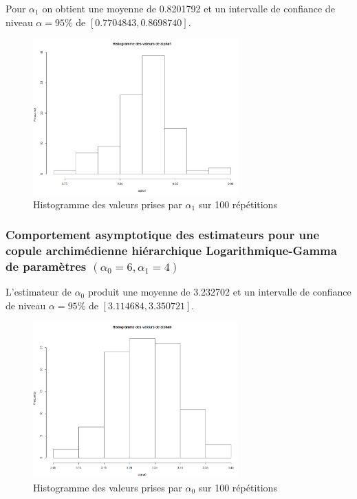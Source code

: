 \documentclass[11pt]{article}
\begin{document}
	Pour $\alpha_{1}$ on obtient une moyenne de  0.8201792 et un intervalle de confiance de niveau $\alpha = 95\% $ de $[0.7704843,0.8698740]$.

	\begin{figure}[H]
		\centering
		\includegraphics[height=6cm]{graph/alpha1.png}
		\caption[Paramètre $\alpha_{1}$]{Histogramme des valeurs prises par $\alpha_{1}$ sur 100 répétitions} 
		\label{alpha1}
	\end{figure}
		

\subsubsection{Comportement asymptotique des estimateurs pour une copule archimédienne hiérarchique Logarithmique-Gamma de paramètres $(\alpha_{0}=6,\alpha_{1}=4)$}

	L'estimateur de $\alpha_{0}$ produit une moyenne de 3.232702 et un intervalle de confiance de niveau $ \alpha = 95\% $ de $[3.114684,3.350721]$.
	
	\begin{figure}[H]
		\centering
		\includegraphics[height=6cm]{graph/alpha0lg.png}
		\caption[Paramètre $\alpha_{0}$]{Histogramme des valeurs prises par $\alpha_{0}$ sur 100 répétitions} 
		\label{alpha0lg}
	\end{figure}
		
\end{document}
